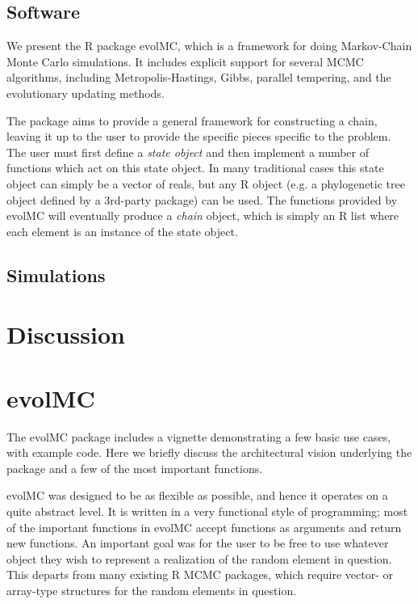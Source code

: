 \documentclass{article}\usepackage[]{graphicx}\usepackage[]{color}
\begin{document}
\subsection{Software}
\label{sec:software}


We present the R package evolMC, which is a framework for doing
Markov-Chain Monte Carlo simulations. It includes explicit support for
several MCMC algorithms, including Metropolis-Hastings, Gibbs,
parallel tempering, and the evolutionary updating methods.

The package aims to provide a general framework for constructing a
chain, leaving it up to the user to provide the specific pieces
specific to the problem. The user must first define a \emph{state
object} and then implement a number of functions which act on this
state object. In many traditional cases this state object can simply
be a vector of reals, but any R object (e.g. a phylogenetic tree
object defined by a 3rd-party package) can be used. The functions
provided by evolMC will eventually produce a \emph{chain} object,
which is simply an R list where each element is an instance of the
state object.

\subsection{Simulations}
\label{sec:simulations}


\section{Discussion}
\label{sec:discussion}





\appendix

\section{evolMC}
\label{sec:evolmc}
The evolMC package includes a vignette demonstrating a few basic use
cases, with example code. Here we briefly discuss the architectural
vision underlying the package and a few of the most important
functions.

evolMC was designed to be as flexible as possible, and hence it
operates on a quite abstract level. It is written in a very functional
style of programming; most of the important functions in evolMC accept
functions as arguments and return new functions. An important goal was
for the user to be free to use whatever object they wish to represent
a realization of the random element in question. This departs from
many existing R MCMC packages, which require vector- or
array-type structures for the random elements in question.
\end{document}
